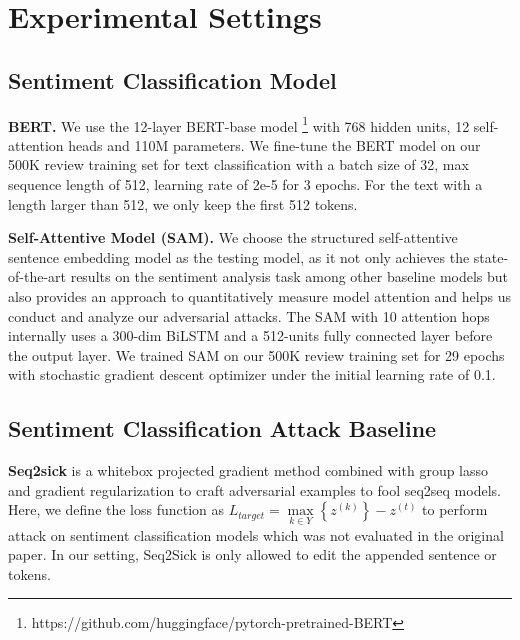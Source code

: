 

\section{Experimental Settings}
\label{appendix:setup}
\subsection{Sentiment Classification Model}
 \textbf{BERT.} We use the 12-layer BERT-base model \footnote{https://github.com/huggingface/pytorch-pretrained-BERT} with 768 hidden units, 12 self-attention heads and 110M parameters. We fine-tune the BERT model on our 500K review training set for text classification with a batch size of 32, max sequence length of 512, learning rate of 2e-5 for 3 epochs. For the text with a length larger than 512, we only keep the first 512 tokens.
 
 
 \textbf{ Self-Attentive Model (SAM).} We choose the structured self-attentive sentence embedding model \citep{nfc512} as the testing model, as it not only achieves the state-of-the-art results on the sentiment analysis task among other baseline models but also provides an approach to quantitatively measure model attention and helps us conduct and analyze our adversarial attacks. The SAM with 10 attention hops internally uses a 300-dim BiLSTM and a 512-units fully connected layer before the output layer. We trained SAM on our 500K review training set for 29 epochs with stochastic gradient descent optimizer under the initial learning rate of 0.1.
 
 \subsection{Sentiment Classification Attack Baseline}
 \textbf{Seq2sick} \citep{seq2sick} is a whitebox projected gradient method combined with group lasso and gradient regularization to craft adversarial examples to fool seq2seq models. Here, we define the loss function as $ L_{target} = \max\limits_{k \in Y} \left\{z^{\left(k\right)} \right\} - z^{\left(t\right)} $ to perform attack on sentiment classification models which was not evaluated in the original paper. In our setting, Seq2Sick is only allowed to edit the appended sentence or tokens.
 
